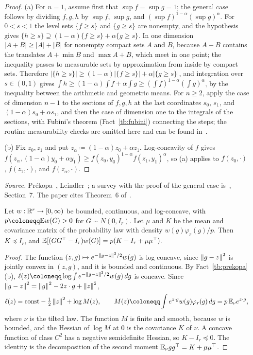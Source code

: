 \begin{proof}
(a) For \(n=1\), assume first that \(\sup f=\sup g=1\); the general case
follows by dividing \(f,g,h\) by \(\sup f\), \(\sup g\), and
\((\sup f)^{1-\alpha}(\sup g)^\alpha\). For \(0<s<1\) the level sets
\(\{f\ge s\}\) and \(\{g\ge s\}\) are nonempty, and the hypothesis gives
\(\{h\ge s\}\supseteq(1-\alpha)\{f\ge s\}+\alpha\{g\ge s\}\). In one dimension
\(|A+B|\ge|A|+|B|\) for nonempty compact sets \(A\) and \(B\), because
\(A+B\) contains the translates \(A+\min B\) and \(\max A+B\), which meet in
one point; the inequality passes to measurable sets by approximation from
inside by compact sets. Therefore
\(|\{h\ge s\}|\ge(1-\alpha)|\{f\ge s\}|+\alpha|\{g\ge s\}|\), and integration over
\(s\in(0,1)\) gives \(\int h\ge(1-\alpha)\int f+\alpha\int g\ge(\int f)^{1-\alpha}(\int g)^\alpha\),
by the inequality between the arithmetic and geometric means. For \(n\ge2\),
apply the case of dimension \(n-1\) to the sections of \(f,g,h\) at the last
coordinates \(s_0\), \(s_1\), and \((1-\alpha)s_0+\alpha s_1\), and then the case of
dimension one to the integrals of the sections, with Fubini's theorem
(Fact~\ref{tb:fubini}) connecting the steps; the routine measurability
checks are omitted here and can be found in~.

(b) Fix \(z_0,z_1\) and put \(z_\alpha\coloneqq (1-\alpha)z_0+\alpha z_1\). Log-concavity of \(f\)
gives \(f(z_\alpha,(1-\alpha)y_0+\alpha y_1)\ge f(z_0,y_0)^{1-\alpha}f(z_1,y_1)^\alpha\), so (a) applies
to \(f(z_0,\cdot)\), \(f(z_1,\cdot)\), and \(f(z_\alpha,\cdot)\).
\end{proof}

\emph{Source.} Pr\'ekopa~, Leindler~; a
survey with the proof of the general case is~, Section~7. The
paper cites Theorem~6 of~.

\begin{fact}\label{tb:tilt}
Let \(w:\mathbb R^r\to[0,\infty)\) be bounded, continuous, and log-concave, with
\(p\coloneqq \E w(G)>0\) for \(G\sim N(0,I_r)\). Let \(\mu\) and \(K\) be the mean and
covariance matrix of the probability law with density \(w(g)\varphi_r(g)/p\).
Then \(K\preceq I_r\), and
\(\mathbb E[(GG^\top-I_r)w(G)]=p(K-I_r+\mu\mu^\top)\).
\end{fact}

\begin{proof}
The function \((z,g)\mapsto e^{-\left\lVert g-z\right\rVert^2/2}w(g)\) is log-concave, since
\(\left\lVert g-z\right\rVert^2\) is jointly convex in \((z,g)\), and it is bounded and
continuous. By Fact~\ref{tb:prekopa}(b), \(\ell(z)\coloneqq \log\int e^{-\norm{g-z}^2/2}
w(g)\,dg\) is concave. Since \(\left\lVert g-z\right\rVert^2=\left\lVert g\right\rVert^2-2z\cdot g+\left\lVert z\right\rVert^2\),
\[
 \ell(z)=\text{const}-\tfrac12\norm z^2+\log M(z),\qquad
 M(z)\coloneqq \int e^{z\cdot g}w(g)\varphi_r(g)\,dg=p\,\E_\nu e^{z\cdot g},
\]
where \(\nu\) is the tilted law. The function \(M\) is finite and smooth,
because \(w\) is bounded, and the Hessian of \(\log M\) at \(0\) is the
covariance \(K\) of \(\nu\). A concave function of class \(C^2\) has a
negative semidefinite Hessian, so \(K-I_r\preceq0\). The identity is the
decomposition of the second moment \(\mathbb E_\nu gg^\top=K+\mu\mu^\top\).
\end{proof}

